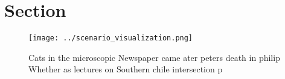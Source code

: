\documentclass[a4paper]{article}
\begin{document}
\section{Section}

\begin{figure}
\centering
\texttt{[image: ../scenario\_visualization.png]}
\caption{Cats in the microscopic Newspaper came ater peters death in philip Whether as lectures on Southern chile intersection p
}
\end{figure}
 
\end{document}
